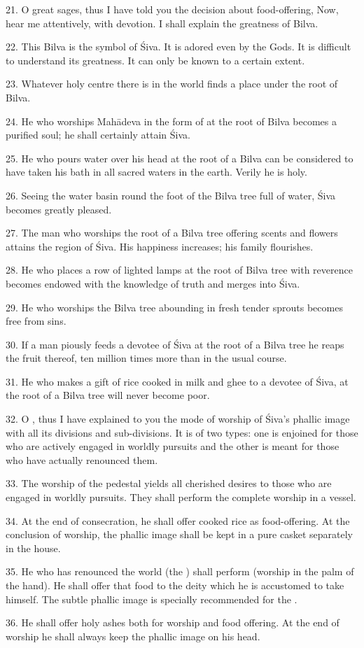 21. O great sages, thus I have told you the decision about food-offering, Now,
hear me attentively, with devotion. I shall explain the greatness of Bilva.

22. This Bilva is the symbol of Śiva. It is adored even by the Gods. It is
difficult to understand its greatness. It can only be known to a certain extent.

23. Whatever holy centre there is in the world finds a place under the root of
Bilva.

24. He who worships Mahādeva in the form of  at the root of Bilva
becomes a purified soul; he shall certainly attain Śiva.

25. He who pours water over his head at the root of a Bilva can be considered to
have taken his bath in all sacred waters in the earth. Verily he is holy.

26. Seeing the water basin round the foot of the Bilva tree full of water, Śiva
becomes greatly pleased.

27. The man who worships the root of a Bilva tree offering scents and flowers
attains the region of Śiva. His happiness increases; his family flourishes.

28. He who places a row of lighted lamps at the root of Bilva tree with
reverence becomes endowed with the knowledge of truth and merges into Śiva.

29. He who worships the Bilva tree abounding in fresh tender sprouts becomes
free from sins.

30. If a man piously feeds a devotee of Śiva at the root of a Bilva tree he
reaps the fruit thereof, ten million times more than in the usual course.

31. He who makes a gift of rice cooked in milk and ghee to a devotee of Śiva,
at the root of a Bilva tree will never become poor.

32. O , thus I have explained to you the mode of worship of Śiva’s
phallic image with all its divisions and sub-divisions. It is of two types: one
is enjoined for those who are actively engaged in worldly pursuits and the other
is meant for those who have actually renounced them.

33. The worship of the pedestal yields all cherished desires to those who are
engaged in worldly pursuits. They shall perform the complete worship in a vessel.

34. At the end of consecration, he shall offer cooked rice  as
food-offering. At the conclusion of worship, the phallic image shall be kept in
a pure casket separately in the house.

35. He who has renounced the world (the ) shall perform 
(worship in the palm of the hand). He shall offer that food to the deity which
he is accustomed to take himself. The subtle phallic image is specially
recommended for the .

36. He shall offer holy ashes both for worship and food offering. At the end of
worship he shall always keep the phallic image on his head.
